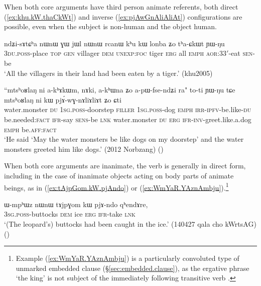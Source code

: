 When both core arguments have third person animate referents, both direct (\ref{ex:khu.kW.thaCkWt}) and inverse (\ref{ex:pjAwGnAliAliAt}) configurations are possible, even when the subject is non-human and the object human.

\begin{exe}
\ex \label{ex:khu.kW.thaCkWt}
\gll ndʑi-sɤtɕʰa nɯnɯ ɣɯ jɯl nɯnɯ rcanɯ kʰu kɯ lonba ʑo tʰa-ɕkɯt ɲɯ-ŋu  \\
\textsc{3du}.\textsc{poss}-place \textsc{top} \textsc{gen} villager \textsc{dem} \textsc{unexp}:\textsc{foc} tiger \textsc{erg} all \textsc{emph} \textsc{aor}:\textsc{3}\fl{}3$'$-eat \textsc{sen}-be \\
 \glt `All the villagers in their land had been eaten by a tiger.'  (khu2005)
\end{exe}

\begin{exe}
\ex \label{ex:pjAwGnAliAliAt}
\gll ``mtsʰoʁlaŋ ni a-kʰɤkɯm, nɤki, a-kʰɯna ʑo a-pɯ-fse-ndʑi ra" to-ti ɲɯ-ŋu tɕe mtsʰoʁlaŋ ni kɯ pjɤ́-wɣ-nɤliɤliɤt ʑo ɕti   \\
water.monster \textsc{du} \textsc{1sg}.\textsc{poss}-doorstep \textsc{filler} \textsc{1sg}.\textsc{poss}-dog \textsc{emph} \textsc{irr}-\textsc{ipfv}-be.like-\textsc{du} be.needed:\textsc{fact} \textsc{ifr}-say \textsc{sens}-be \textsc{lnk} water.monster \textsc{du} \textsc{erg} \textsc{ifr}-\textsc{inv}-greet.like.a.dog \textsc{emph} be.\textsc{aff}:\textsc{fact} \\
\glt `He said `May the water monsters be like dogs on my doorstep' and the water monsters greeted him like dogs.' (2012 Norbzang) 	()
\end{exe}

When both core arguments are inanimate, the verb is generally in direct form, including in the case of inanimate objects acting on body parts of animate beings, as in (\ref{ex:tAjpGom.kW.pjAndo}) or (\ref{ex:WmYaR.YAznAmbju}).\footnote{Example (\ref{ex:WmYaR.YAznAmbju}) is a particularly convoluted type of unmarked embedded clause (§\ref{sec:embedded.clause}), as the ergative phrase  `the king' is not subject of the immediately following transitive verb . }

\begin{exe}
\ex \label{ex:tAjpGom.kW.pjAndo}
\gll ɯ-mpʰɯz nɯnɯ tɤjpɣom kɯ pjɤ-ndo qʰendɤre, \\
\textsc{3sg}.\textsc{poss}-buttocks \textsc{dem} ice \textsc{erg} \textsc{ifr}-take \textsc{lnk} \\
\glt `(The leopard's) buttocks had been caught in the ice.' (140427 qala cho kWrtsAG)
()
\end{exe}

